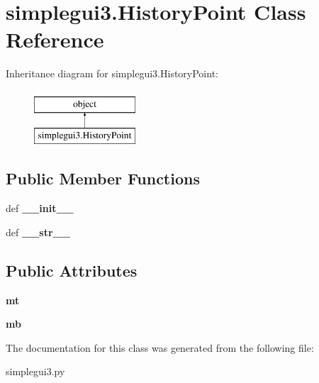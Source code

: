 \hypertarget{classsimplegui3_1_1_history_point}{\section{simplegui3.\-History\-Point Class Reference}
\label{classsimplegui3_1_1_history_point}
}
Inheritance diagram for simplegui3.\-History\-Point\-:\begin{figure}[H]
\begin{center}
\leavevmode
\includegraphics[height=2.000000cm]{classsimplegui3_1_1_history_point}
\end{center}
\end{figure}
\subsection*{Public Member Functions}
\begin{DoxyCompactItemize}
\item 
\hypertarget{classsimplegui3_1_1_history_point_a67048ad05a793a2f9e6c40dabc2c3f6a}{def {\bfseries \-\_\-\-\_\-init\-\_\-\-\_\-}}\label{classsimplegui3_1_1_history_point_a67048ad05a793a2f9e6c40dabc2c3f6a}

\item 
\hypertarget{classsimplegui3_1_1_history_point_a6fa9f9c36c28f45f994720c3eeb6b904}{def {\bfseries \-\_\-\-\_\-str\-\_\-\-\_\-}}\label{classsimplegui3_1_1_history_point_a6fa9f9c36c28f45f994720c3eeb6b904}

\end{DoxyCompactItemize}
\subsection*{Public Attributes}
\begin{DoxyCompactItemize}
\item 
\hypertarget{classsimplegui3_1_1_history_point_ad2f58b8ef1c0a1b0fea4e9c3ae6839f2}{{\bfseries mt}}\label{classsimplegui3_1_1_history_point_ad2f58b8ef1c0a1b0fea4e9c3ae6839f2}

\item 
\hypertarget{classsimplegui3_1_1_history_point_a2e70b601b95a033abefefcc44a746b5f}{{\bfseries mb}}\label{classsimplegui3_1_1_history_point_a2e70b601b95a033abefefcc44a746b5f}

\end{DoxyCompactItemize}


The documentation for this class was generated from the following file\-:\begin{DoxyCompactItemize}
\item 
simplegui3.\-py\end{DoxyCompactItemize}
